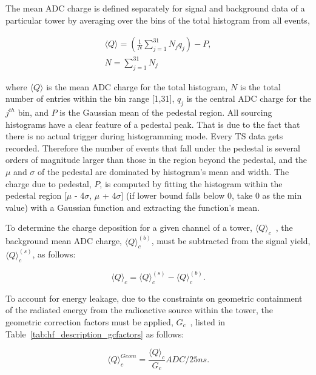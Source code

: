 The mean ADC charge is defined separately for signal and background data of a
particular tower by averaging over the bins of the total histogram from all
events,
\begin{center}
   \begin{eqnarray}
      \label{eq:Histo_Avg}
      \langle{Q}\rangle = (\frac{1}{N} \sum\limits_{j=1}^{31} N_{j}q_{j}) - P, \\
      N = \sum\limits_{j=1}^{31} N_j \nonumber
   \end{eqnarray}
\end{center}

where $\langle{Q}\rangle$ is the mean ADC charge for the total histogram,
$N$ is the total number of entries within the bin range [1,31], $q_j$ is
the central ADC charge for the $j^{th}$ bin, and $P$ is the Gaussian mean of
the pedestal region. All sourcing histograms have a clear feature of a pedestal
peak. That is due to the fact that there is no actual trigger during
histogramming mode. Every TS data gets recorded. Therefore the number of events
that fall under the pedestal is several orders of magnitude larger than those in the region beyond the pedestal, and the $\mu$ and $\sigma$ of the pedestal are dominated
by histogram's mean and width. The charge due to pedestal, $P$, is computed by fitting the histogram within the pedestal region [$\mu$ - 4$\sigma$, $\mu$ + 4$\sigma$] (if lower bound falls below 0, take 0 as the min value) with a Gaussian function and extracting the function's mean.

To determine the charge deposition for a given channel of a tower,
${\langle{Q}\rangle}_c$~, the background mean ADC
charge, ${\langle{Q}\rangle}^{(b)}_{c}$, must be subtracted from the signal yield,
${\langle{Q}\rangle}^{(s)}_{c}$, as follows:
\begin{center}
   \begin{equation}
      \label{eq:Sig_Min_Bkg}
      {\langle{Q}\rangle}_{c} = {\langle{Q}\rangle}^{(s)}_{c} - {\langle{Q}\rangle}^{(b)}_{c}.
   \end{equation}
\end{center}

To account for energy leakage, due to the constraints on geometric
containment of the radiated energy from the radioactive source within the tower,
the geometric correction factors must be applied, $G_c$~, listed in
Table~\ref{tab:hf_description_gcfactors} as follows:
\begin{center}
   \begin{equation}
      \label{eq:Sig_Corr}
      {\langle{Q}\rangle}^{Geom}_{c} = \frac{{\langle{Q}\rangle}_{c}}{G_{c}}\unit{ADC/25ns}.
   \end{equation}
\end{center}

